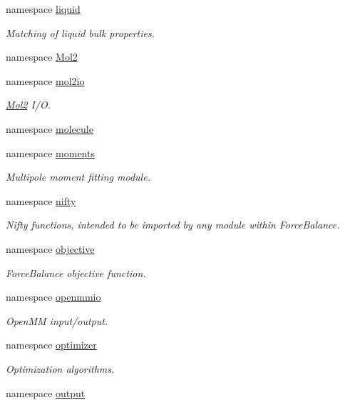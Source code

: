 \begin{DoxyCompactItemize}
namespace \hyperlink{namespaceforcebalance_1_1liquid}{liquid}
\begin{DoxyCompactList}\small\item\em \-Matching of liquid bulk properties. \end{DoxyCompactList}\item 
namespace \hyperlink{namespaceforcebalance_1_1Mol2}{\-Mol2}
\item 
namespace \hyperlink{namespaceforcebalance_1_1mol2io}{mol2io}
\begin{DoxyCompactList}\small\item\em \hyperlink{namespaceforcebalance_1_1Mol2}{\-Mol2} \-I/\-O. \end{DoxyCompactList}\item 
namespace \hyperlink{namespaceforcebalance_1_1molecule}{molecule}
\item 
namespace \hyperlink{namespaceforcebalance_1_1moments}{moments}
\begin{DoxyCompactList}\small\item\em \-Multipole moment fitting module. \end{DoxyCompactList}\item 
namespace \hyperlink{namespaceforcebalance_1_1nifty}{nifty}
\begin{DoxyCompactList}\small\item\em \-Nifty functions, intended to be imported by any module within \-Force\-Balance. \end{DoxyCompactList}\item 
namespace \hyperlink{namespaceforcebalance_1_1objective}{objective}
\begin{DoxyCompactList}\small\item\em \-Force\-Balance objective function. \end{DoxyCompactList}\item 
namespace \hyperlink{namespaceforcebalance_1_1openmmio}{openmmio}
\begin{DoxyCompactList}\small\item\em \-Open\-M\-M input/output. \end{DoxyCompactList}\item 
namespace \hyperlink{namespaceforcebalance_1_1optimizer}{optimizer}
\begin{DoxyCompactList}\small\item\em \-Optimization algorithms. \end{DoxyCompactList}\item 
namespace \hyperlink{namespaceforcebalance_1_1output}{output}

\end{DoxyCompactItemize}
